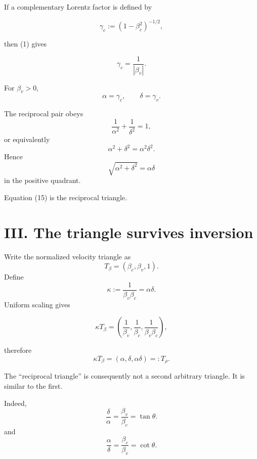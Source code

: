 \documentclass[9pt,twocolumn]{article}
\begin{document}
If a complementary Lorentz factor is defined by

$$
\gamma_c:=(1-\beta_c^2)^{-1/2},
$$

then (1) gives

$$
\gamma_c=\frac1{|\beta_v|}.
$$

For $\beta_v>0$,
\begin{equation}
\boxed{
\alpha=\gamma_c,\qquad
\delta=\gamma_v.
}
\tag{12}
\end{equation}

The reciprocal pair obeys
\begin{equation}
\boxed{
\frac1{\alpha^2}+\frac1{\delta^2}=1,
}
\tag{13}
\end{equation}
or equivalently
\begin{equation}
\boxed{
\alpha^2+\delta^2=\alpha^2\delta^2.
}
\tag{14}
\end{equation}
Hence
\begin{equation}
\sqrt{\alpha^2+\delta^2}=\alpha\delta
\tag{15}
\end{equation}
in the positive quadrant.

Equation (15) is the reciprocal triangle.

\section*{III. The triangle survives inversion}

Write the normalized velocity triangle as
\begin{equation}
T_\beta=(\beta_c,\beta_v,1).
\tag{16}
\end{equation}
Define
\begin{equation}
\kappa
:=
\frac1{\beta_v\beta_c}
=\alpha\delta.
\tag{17}
\end{equation}
Uniform scaling gives

$$
\kappa T_\beta
=
\left(
\frac1{\beta_v},
\frac1{\beta_c},
\frac1{\beta_v\beta_c}
\right),
$$

therefore
\begin{equation}
\boxed{
\kappa T_\beta=(\alpha,\delta,\alpha\delta)=:T_\rho.
}
\tag{18}
\end{equation}

The ``reciprocal triangle'' is consequently not a second arbitrary triangle. It is similar to the first.

Indeed,
\begin{equation}
\frac{\delta}{\alpha}
=\frac{\beta_v}{\beta_c}
=\tan\theta.
\tag{19}
\end{equation}
and
\begin{equation}
\frac{\alpha}{\delta}
=\frac{\beta_c}{\beta_v}
=\cot\theta.
\tag{20}
\end{equation}
\end{document}
